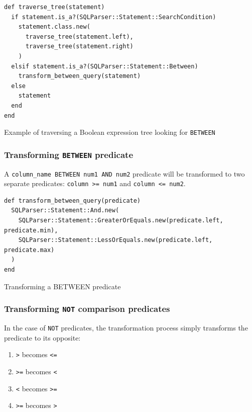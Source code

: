 \begin{code}
\begin{verbatim}
def traverse_tree(statement)
  if statement.is_a?(SQLParser::Statement::SearchCondition)
    statement.class.new(
      traverse_tree(statement.left),
      traverse_tree(statement.right)
    )
  elsif statement.is_a?(SQLParser::Statement::Between)
    transform_between_query(statement)
  else
    statement
  end
end
\end{verbatim}
\caption{Example of traversing a Boolean expression tree looking for \texttt{BETWEEN}}
\end{code}

\subsubsection{Transforming \texttt{BETWEEN} predicate}

A \texttt{column_name BETWEEN num1 AND num2} predicate will be transformed to two separate predicates: \texttt{column >= num1} and \texttt{column <= num2}. 

\begin{code}
\begin{verbatim}
def transform_between_query(predicate)
  SQLParser::Statement::And.new(
    SQLParser::Statement::GreaterOrEquals.new(predicate.left, predicate.min),
    SQLParser::Statement::LessOrEquals.new(predicate.left, predicate.max)
  )
end
\end{verbatim}
\caption{Transforming a BETWEEN predicate}
\label{fig:transforming_a_betweeb}
\end{code}

\subsubsection{Transforming \texttt{NOT} comparison predicates}

In the case of \texttt{NOT} predicates, the transformation process simply transforms the predicate to its opposite:
\begin{enumerate}
    \item \texttt{>} becomes \texttt{<=}
    \item \texttt{>=} becomes \texttt{<}
    \item \texttt{<} becomes \texttt{>=}
    \item \texttt{>=} becomes \texttt{>}
\end{enumerate}

